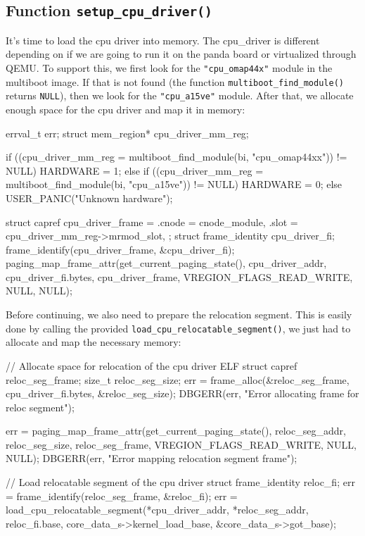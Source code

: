 \documentclass[a4paper,twoside,openright]{report}
\renewcommand{\t}[1]{%
	{\texttt{#1}}}
\begin{document}
\subsection{Function \t{setup\_cpu\_driver()}}
It's time to load the cpu driver into memory. The cpu\_driver is different
depending on if we are going to run it on the panda board or virtualized
through QEMU. To support this, we first look for the \t{"cpu\_omap44x"} module
in the multiboot image. If that is not found (the function
\t{multiboot\_find\_module()} returns \t{NULL}), then we look for the
\t{"cpu\_a15ve"} module.  After that, we allocate enough space for the cpu
driver and map it in memory:
\begin{pandacode}
	errval_t err;
	struct mem_region* cpu_driver_mm_reg;
	
	if ((cpu_driver_mm_reg = multiboot_find_module(bi, "cpu_omap44xx")) != NULL) {
		HARDWARE = 1;
	} else if ((cpu_driver_mm_reg = multiboot_find_module(bi, "cpu_a15ve")) != NULL) {
		HARDWARE = 0;
	} else { USER_PANIC("Unknown hardware\n"); }
	
	struct capref cpu_driver_frame = {
		.cnode  = cnode_module,
		.slot   = cpu_driver_mm_reg->mrmod_slot,
	};
	struct frame_identity cpu_driver_fi;
	frame_identify(cpu_driver_frame, &cpu_driver_fi);
	paging_map_frame_attr(get_current_paging_state(),
	cpu_driver_addr, cpu_driver_fi.bytes, cpu_driver_frame, 
	VREGION_FLAGS_READ_WRITE, NULL, NULL);
\end{pandacode}
Before continuing, we also need to prepare the relocation segment. This is
easily done by calling the provided \t{load\_cpu\_relocatable\_segment()}, 
we just had to allocate and map the necessary memory:
\begin{pandacode}
// Allocate space for relocation of the cpu driver ELF
struct capref reloc_seg_frame;
size_t reloc_seg_size;
err = frame_alloc(&reloc_seg_frame, cpu_driver_fi.bytes, &reloc_seg_size);
DBGERR(err, "Error allocating frame for reloc segment\n");

err = paging_map_frame_attr(get_current_paging_state(),
reloc_seg_addr, reloc_seg_size, reloc_seg_frame,
VREGION_FLAGS_READ_WRITE, NULL, NULL);
DBGERR(err, "Error mapping relocation segment frame\n"); 

// Load relocatable segment of the cpu driver
struct frame_identity reloc_fi;
err = frame_identify(reloc_seg_frame, &reloc_fi);
err = load_cpu_relocatable_segment(*cpu_driver_addr, *reloc_seg_addr, reloc_fi.base,
core_data_s->kernel_load_base,
&core_data_s->got_base);
\end{pandacode}
\end{document}
